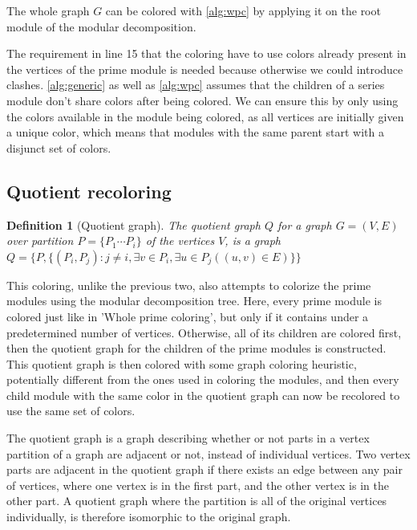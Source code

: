\documentclass[a4paper]{article}
\newtheorem{definition}{Definition}[section]
\begin{document}
The whole graph $G$ can be colored with \autoref{alg:wpc} by applying it on the
root module of the modular decomposition.

The requirement in line 15 that the coloring have to use colors already present
in the vertices of the prime module is needed because otherwise we could
introduce clashes. \autoref{alg:generic} as well as \autoref{alg:wpc} assumes that the children of a series
module don't share colors after being colored. We can ensure this by only using the colors available
in the module being colored, as all vertices are initially given a unique color,
which means that modules with the same parent start with a disjunct set of
colors.

\subsection{Quotient recoloring}

\begin{definition}[Quotient graph]
    The quotient graph $Q$ for a graph $G = (V,E)$ over partition 
    $P = \{P_1 \cdots P_i\}$  of the vertices $V$, is a graph 
    $Q = \{P, \{(P_i,P_j) : j\neq i, \exists v \in P_i,\exists u \in P_j( (u,v)
    \in E)   \} \}  $
\end{definition}

This coloring, unlike the previous two, also attempts to colorize the prime
modules using the modular decomposition tree. Here, every prime module is
colored just like in 'Whole prime coloring', but only if it contains under a
predetermined number of vertices.  Otherwise, all of its children are colored
first, then the quotient graph for the children of the prime modules is
constructed. This quotient graph is then colored with some graph coloring
heuristic, potentially different from the ones used in coloring the modules,
and then every child module with the same color in the quotient graph can now
be recolored to use the same set of colors.

The quotient graph is a graph describing whether or not parts in a vertex partition of a
graph are adjacent or not, instead of individual vertices. Two vertex
parts are adjacent in the quotient graph if there exists an edge between
any pair of vertices, where one vertex is in the first part, and the other
vertex is in the other part. A quotient graph where the partition is all of
the original vertices individually, is therefore isomorphic to the original
graph.
\end{document}
